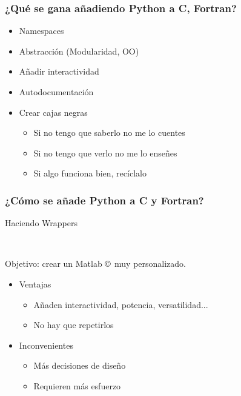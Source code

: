 \documentclass{beamer}
\begin{document}
\begin{frame}
 \frametitle{¿Qué se gana añadiendo Python a C, Fortran?}
\begin{itemize}
 \item Namespaces
 \item Abstracción (Modularidad, OO)
 \item Añadir interactividad
 \item Autodocumentación
 \item Crear cajas negras
 \begin{itemize}
  \item Si no tengo que saberlo no me lo cuentes
  \item Si no tengo que verlo no me lo enseñes
  \item Si algo funciona bien, recíclalo
 \end{itemize}
\end{itemize}
\end{frame}

\begin{frame}
 \frametitle{¿Cómo se añade Python a C y Fortran?}
\begin{center}
 Haciendo Wrappers\\
\vspace{1cm}
\\
\end{center}
Objetivo: crear un Matlab $\copyright$ muy personalizado.
\begin{itemize}
 \item Ventajas
 \begin{itemize}
 \item Añaden interactividad, potencia, versatilidad...
 \item No hay que repetirlos
 \end{itemize}
 \item Inconvenientes
 \begin{itemize}
 \item Más decisiones de diseño
 \item Requieren más esfuerzo
 \end{itemize}
 \end{itemize}
\end{frame}
\end{document}
